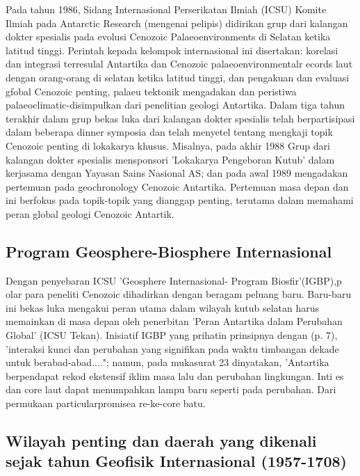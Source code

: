 		Pada tahun 1986, Sidang Internasional Perserikatan Ilmiah (ICSU) Komite Ilmiah pada Antarctic Research (mengenai pelipis) didirikan grup dari 
	kalangan dokter spesialis pada evolusi Cenozoic Palaeoenvironments di Selatan ketika latitud tinggi. Perintah kepada kelompok internasional ini 
	disertakan: korelasi dan integrasi terresulal Antartika dan Cenozoic palaeoenvironmentalr ecords laut dengan orang-orang di selatan ketika latitud 
	tinggi, dan pengakuan dan evaluasi gfobal Cenozoic penting, palaeu tektonik mengadakan dan peristiwa palaeoclimatic-disimpulkan dari penelitian 
	geologi Antartika. Dalam tiga tahun terakhir dalam grup bekas luka dari kalangan dokter spesialis telah berpartisipasi dalam beberapa dinner symposia 
	dan telah menyetel tentang mengkaji topik Cenozoic penting di lokakarya khusus. Misalnya, pada akhir 1988 Grup dari kalangan dokter spesialis 
	mensponsori 'Lokakarya Pengeboran Kutub' dalam kerjasama dengan Yayasan Sains Nasional AS; dan pada awal 1989 mengadakan pertemuan pada geochronology 
	Cenozoic Antartika. Pertemuan masa depan dan ini berfokus pada topik-topik yang dianggap penting, terutama dalam memahami peran global 
	geologi Cenozoic Antartik.
	
	
\subsection{Program Geosphere-Biosphere Internasional}

		Dengan penyebaran ICSU 'Geosphere Internasional- Program Biosfir'(IGBP),p olar para peneliti Cenozoic dihadirkan dengan beragam peluang baru. 
	Baru-baru ini bekas luka mengakui peran utama dalam wilayah kutub selatan harus memainkan di masa depan oleh penerbitan 'Peran Antartika dalam 
	Perubahan Global' (ICSU Tekan). Inisiatif IGBP yang prihatin prinsipnya dengan (p. 7), 'interaksi kunci dan perubahan yang signifikan pada waktu 
	timbangan dekade untuk berabad-abad...."; namun, pada mukasurat 23 dinyatakan, 'Antartika berpendapat rekod ekstensif iklim masa lalu dan perubahan lingkungan. 
	Inti es dan core laut dapat menumpahkan lampu baru seperti pada perubahan. Dari permukaan particularpromisea re-ke-core batu.
	
	
\subsection{Wilayah penting dan daerah yang dikenali sejak tahun Geofisik Internasional (1957-1708)}

